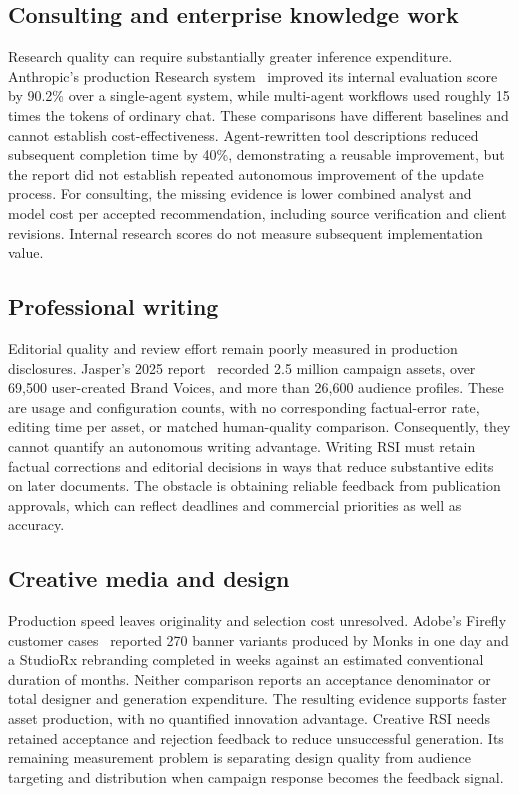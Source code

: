 \subsection{Consulting and enterprise knowledge work}
Research quality can require substantially greater inference expenditure. Anthropic's production Research system~\cite{anthropic2025research} improved its internal evaluation score by 90.2\% over a single-agent system, while multi-agent workflows used roughly 15 times the tokens of ordinary chat. These comparisons have different baselines and cannot establish cost-effectiveness. Agent-rewritten tool descriptions reduced subsequent completion time by 40\%, demonstrating a reusable improvement, but the report did not establish repeated autonomous improvement of the update process. For consulting, the missing evidence is lower combined analyst and model cost per accepted recommendation, including source verification and client revisions. Internal research scores do not measure subsequent implementation value.

\subsection{Professional writing}
Editorial quality and review effort remain poorly measured in production disclosures. Jasper's 2025 report~\cite{jasper2025review} recorded 2.5 million campaign assets, over 69,500 user-created Brand Voices, and more than 26,600 audience profiles. These are usage and configuration counts, with no corresponding factual-error rate, editing time per asset, or matched human-quality comparison. Consequently, they cannot quantify an autonomous writing advantage. Writing RSI must retain factual corrections and editorial decisions in ways that reduce substantive edits on later documents. The obstacle is obtaining reliable feedback from publication approvals, which can reflect deadlines and commercial priorities as well as accuracy.

\subsection{Creative media and design}
Production speed leaves originality and selection cost unresolved. Adobe's Firefly customer cases~\cite{adobe2025firefly} reported 270 banner variants produced by Monks in one day and a StudioRx rebranding completed in weeks against an estimated conventional duration of months. Neither comparison reports an acceptance denominator or total designer and generation expenditure. The resulting evidence supports faster asset production, with no quantified innovation advantage. Creative RSI needs retained acceptance and rejection feedback to reduce unsuccessful generation. Its remaining measurement problem is separating design quality from audience targeting and distribution when campaign response becomes the feedback signal.

